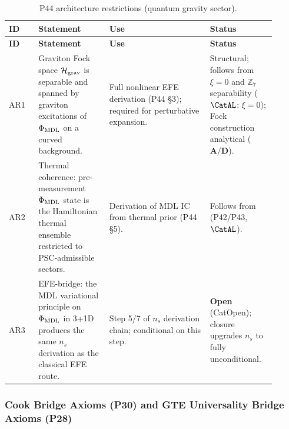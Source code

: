 \begingroup\footnotesize\renewcommand{\arraystretch}{1.2}
\begin{longtable}{@{}P{0.10\linewidth}P{0.24\linewidth}P{0.34\linewidth}P{0.22\linewidth}@{}}
\caption{P44 architecture restrictions (quantum gravity sector).}
\label{tab:mi-p44-axioms}\\
\toprule
\textbf{ID} & \textbf{Statement} & \textbf{Use} & \textbf{Status} \\
\midrule
\endfirsthead
\midrule
\textbf{ID} & \textbf{Statement} & \textbf{Use} & \textbf{Status} \\
\midrule
\endhead
\bottomrule
\endfoot
AR1 & Graviton Fock space $\mathcal{H}_{\rm grav}$ is separable and spanned by graviton
  excitations of $\Phi_{\rm MDL}$ on a curved background. &
  Full nonlinear EFE derivation (P44 \S3); required for
  perturbative expansion. &
  Structural; follows from $\xi=0$ and $\mathbb{Z}_7$ separability ($\CatAL$: $\xi=0$);
  Fock construction analytical ($\mathbf{A/D}$). \\
AR2 & Thermal coherence: pre-measurement $\Phi_{\rm MDL}$ state is
  the Hamiltonian thermal ensemble restricted to PSC-admissible sectors. &
  Derivation of MDL IC from thermal prior (P44 \S5). &
  Follows from  (P42/P43, $\CatAL$). \\
AR3 & EFE-bridge: the MDL variational principle on $\Phi_{\rm MDL}$ in 3+1D
  produces the same $n_s$ derivation as the classical EFE route. &
  Step 5/7 of $n_s$ derivation chain; conditional on this step. &
  \textbf{Open} (CatOpen); closure upgrades $n_s$ to fully unconditional. \\
\end{longtable}
\endgroup

\subsubsection{Cook Bridge Axioms (P30) and GTE Universality Bridge Axioms (P28)}
\label{sec:mi-bridge-axioms}

